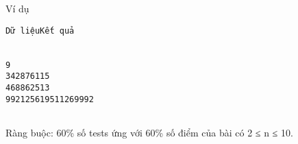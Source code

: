 Ví dụ
\begin{verbatim}
Dữ liệuKết quả


9
342876115
468862513
992125619511269992


\end{verbatim}

Ràng buộc: 60\% số tests ứng với 60\% số điểm của bài có 2 ≤ n ≤ 10.